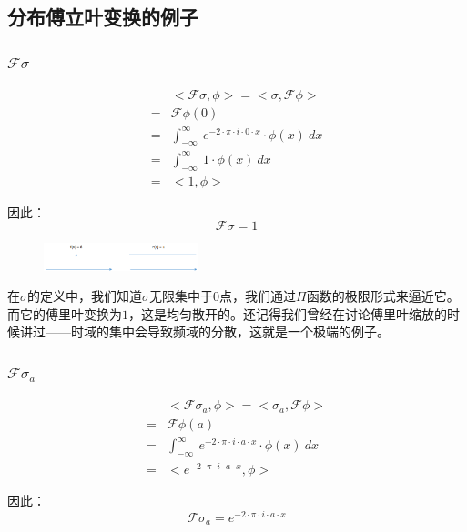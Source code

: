\subsection{分布傅立叶变换的例子}
\subsubsection{$\mathcal{F}\sigma$}
\begin{align*}
	  & <\mathcal{F}\sigma,\phi>  =  <\sigma,\mathcal{F}\phi>                          \\
	= & \mathcal{F}\phi(0)                                                             \\
	= & \int_{-\infty}^{\infty}\ e^{-2\cdot \pi\cdot i\cdot 0\cdot x}\cdot \phi(x)\ dx \\
	= & \int_{-\infty}^{\infty}\ 1\cdot \phi(x)\ dx                                    \\
	= & <1,\phi>
\end{align*}

因此：
\begin{equation}
	\mathcal{F}\sigma=1
\end{equation}
\begin{figure}[H]
	\centering
	\includegraphics[width=0.4\textwidth]{assets/fdelta.png}
\end{figure}
在$\sigma$的定义中，我们知道$\sigma$无限集中于$0$点，我们通过$\Pi$函数的极限形式来逼近它。而它的傅里叶变换为$1$，这是均匀散开的。还记得我们曾经在讨论傅里叶缩放的时候讲过——时域的集中会导致频域的分散，这就是一个极端的例子。
\subsubsection{$\mathcal{F}\sigma_a$}
\begin{align*}
	  & <\mathcal{F}\sigma_a,\phi>  =  <\sigma_a,\mathcal{F}\phi>                      \\
	= & \mathcal{F}\phi(a)                                                             \\
	= & \int_{-\infty}^{\infty}\ e^{-2\cdot \pi\cdot i\cdot a\cdot x}\cdot \phi(x)\ dx \\
	= & <e^{-2\cdot \pi\cdot i\cdot a\cdot x},\phi>
\end{align*}

因此：
\begin{equation}
	\mathcal{F}\sigma_a=e^{-2\cdot \pi\cdot i\cdot a\cdot x}
\end{equation}

